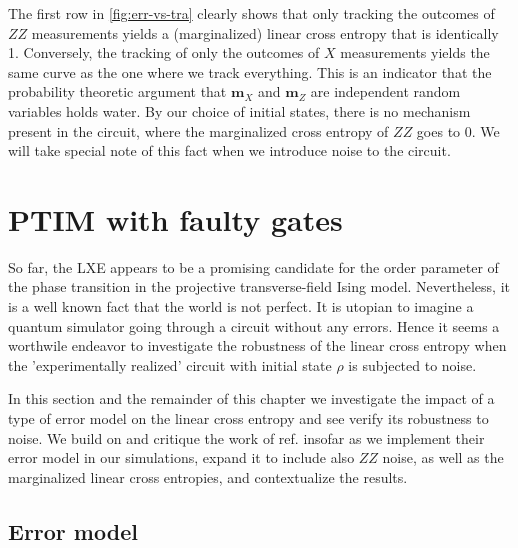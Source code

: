 The first row in \cref{fig:err-vs-tra} clearly shows that only tracking the outcomes
of $ZZ$ measurements yields a (marginalized) linear cross entropy that is
identically 1. Conversely, the tracking of only the outcomes of $X$
measurements yields the same curve as the one where we track everything. This
is an indicator that the probability theoretic argument that $\mathbf{m}_X$ and
$\mathbf{m}_Z$ are independent random variables holds water. By our choice of
initial states, there is no mechanism present in the circuit, where the
marginalized cross entropy of $ZZ$ goes to 0. We will take special note of this
fact when we introduce noise to the circuit.

\section{PTIM with faulty gates}
So far, the LXE appears to be a promising candidate for the order parameter of
the phase transition in the projective transverse-field Ising model.
Nevertheless, it is a well known fact that the world is not perfect. It is
utopian to imagine a quantum simulator going through a circuit without any
errors. Hence it seems a worthwile endeavor to investigate the robustness of the
linear cross entropy when the 'experimentally realized' circuit with initial state $\rho$ is
subjected to noise.

In this section and the remainder of this chapter we investigate the
impact of a type of error model on the linear cross entropy and see verify its
robustness to noise. We build on and critique the work of ref.
\cite{tikhanovskayaUniversalityCrossEntropy2023} insofar as we
implement their error model in our simulations, expand it to include also $ZZ$
noise, as well as the marginalized linear cross entropies, and contextualize
the results.
\clearpage
\subsection{Error model}\label{sec:errormodel}


